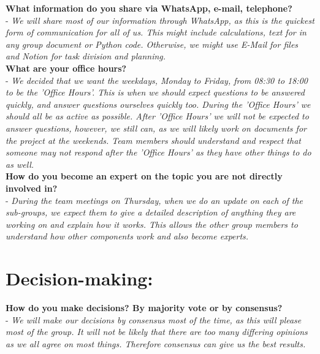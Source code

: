 \textbf{What information do you share via WhatsApp, e-mail, telephone?\\}
    - \textit{We will share most of our information through WhatsApp, as this is the quickest form of communication for all of us. This might include calculations, text for in any group document or Python code. Otherwise, we might use E-Mail for files and Notion for task division and planning.}\\
    
\textbf{What are your office hours?\\} 
    - \textit{We decided that we want the weekdays, Monday to Friday, from 08:30 to 18:00 to be the 'Office Hours'. This is when we should expect questions to be answered quickly, and answer questions ourselves quickly too. During the 'Office Hours' we should all be as active as possible. After 'Office Hours' we will not be expected to answer questions, however, we still can, as we will likely work on documents for the project at the weekends. Team members should understand and respect that someone may not respond after the 'Office Hours' as they have other things to do as well.}\\

\textbf{How do you become an expert on the topic you are not directly involved in?\\}
    - \textit{During the team meetings on Thursday, when we do an update on each of the sub-groups, we expect them to give a detailed description of anything they are working on and explain how it works. This allows the other group members to understand how other components work and also become experts.}\\

\section*{\textcolor{Delft_Blue}{\textbf{Decision-making:\vspace{5pt}}}}
\textbf{How do you make decisions? By majority vote or by consensus?\\}
    - \textit{We will make our decisions by consensus most of the time, as this will please most of the group. It will not be likely that there are too many differing opinions as we all agree on most things. Therefore consensus can give us the best results.}\\

